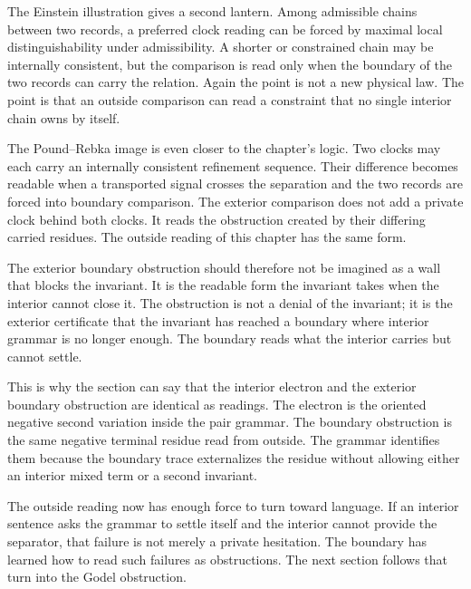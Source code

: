 The Einstein illustration gives a second lantern. Among admissible chains
between two records, a preferred clock reading can be forced by maximal local
distinguishability under admissibility. A shorter or constrained chain may be
internally consistent, but the comparison is read only when the boundary of
the two records can carry the relation. Again the point is not a new physical
law. The point is that an outside comparison can read a constraint that no
single interior chain owns by itself.

The Pound--Rebka image is even closer to the chapter's logic. Two clocks may
each carry an internally consistent refinement sequence. Their difference
becomes readable when a transported signal crosses the separation and the
two records are forced into boundary comparison. The exterior comparison
does not add a private clock behind both clocks. It reads the obstruction
created by their differing carried residues. The outside reading of this
chapter has the same form.

The exterior boundary obstruction should therefore not be imagined as a wall
that blocks the invariant. It is the readable form the invariant takes when
the interior cannot close it. The obstruction is not a denial of the
invariant; it is the exterior certificate that the invariant has reached a
boundary where interior grammar is no longer enough. The boundary reads what
the interior carries but cannot settle.

This is why the section can say that the interior electron and the exterior
boundary obstruction are identical as readings. The electron is the oriented
negative second variation inside the pair grammar. The boundary obstruction
is the same negative terminal residue read from outside. The grammar
identifies them because the boundary trace externalizes the residue without
allowing either an interior mixed term or a second invariant.

The outside reading now has enough force to turn toward language. If an
interior sentence asks the grammar to settle itself and the interior cannot
provide the separator, that failure is not merely a private hesitation. The
boundary has learned how to read such failures as obstructions. The next
section follows that turn into the Godel obstruction.
